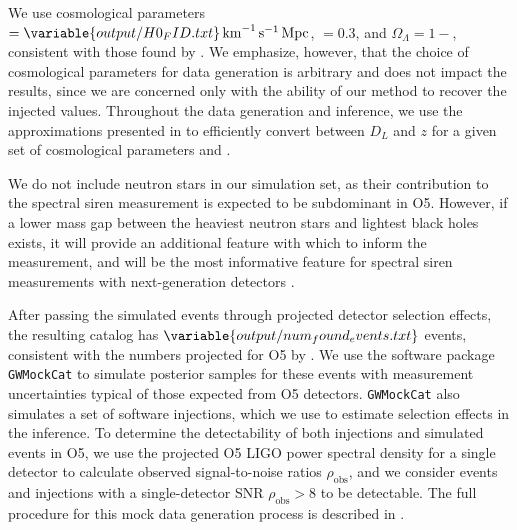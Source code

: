 \documentclass[preprint2,linenumbers]{aastex631}
\begin{document}
We use cosmological parameters \Ho$=\variable{output/H0_FID.txt}\Hunits$, \Omm$=0.3$, and $\Omega_\Lambda=1-$\Omm, consistent with those found by \citet{planck_collaboration_planck_2016}.
We emphasize, however, that the choice of cosmological parameters for data generation is arbitrary and does not impact the results, since we are concerned only with the ability of our method to recover the injected values.
Throughout the data generation and inference, we use the approximations presented in \citet{adachi_analytical_2012} to efficiently convert between $D_L$ and $z$ for a given set of cosmological parameters \Omm{} and \Ho.

We do not include neutron stars in our simulation set, as their contribution to the spectral siren measurement is expected to be subdominant in \ac{O5}.
However, if a lower mass gap between the heaviest neutron stars and lightest black holes exists, it will provide an additional feature with which to inform the measurement, and will be the most informative feature for spectral siren measurements with next-generation detectors \citep{ezquiaga_spectral_2022}.

After passing the simulated events through projected detector selection effects, the resulting catalog has $\variable{output/num_found_events.txt}$ events, consistent with the numbers projected for \ac{O5} by \citet{kiendrebeogo_updated_2023}.
We use the software package \texttt{GWMockCat} \citep{farah_things_2023} to simulate posterior samples for these events with measurement uncertainties typical of those expected from \ac{O5} detectors.
\texttt{GWMockCat} also simulates a set of software injections, which we use to estimate selection effects in the inference.
To determine the detectability of both injections and simulated events in O5, we use the projected \ac{O5} LIGO power spectral density \citep{obsscen_noise_curves,abbott_prospects_2020} for a single detector to calculate observed signal-to-noise ratios $\rho_{\text{obs}}$, and we consider events and injections with a single-detector SNR $\rho_{\text{obs}}>8$ to be detectable. 
The full procedure for this mock data generation process is described in \citet{fishbach_where_2017, farah_things_2023, essick_ensuring_2024}.
\end{document}
